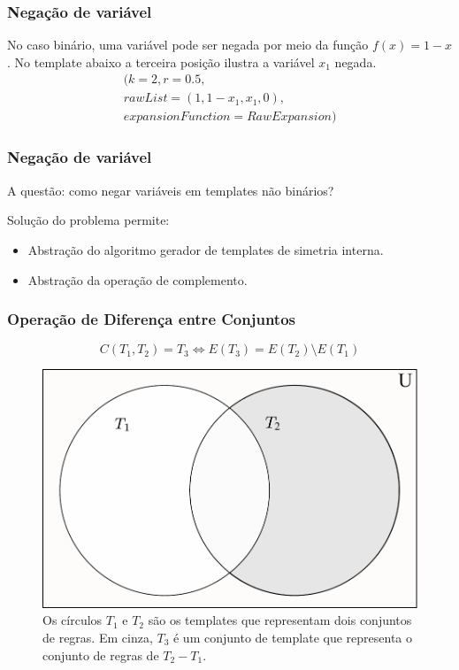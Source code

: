 \documentclass[aspectratio=43,hyperref={pdfpagelabels=false}]{beamer}
\begin{document}
 \begin{frame}
     \frametitle{Negação de variável}
     No caso binário, uma variável pode ser negada por meio da função $f(x)=1-x$. No template abaixo a terceira posição ilustra a variável $x_1$ negada. 
    \begin{equation}
    \begin{split}
    (k=2, r=0.5, \\
    rawList= (1,1-x_1,x_1,0), \\
    expansionFunction=RawExpansion)
    \end{split}
    \end{equation}
 \end{frame}

 \begin{frame}
     \frametitle{Negação de variável}
     A questão: como negar variáveis em templates não binários?

    \begin{alertblock}{Solução do problema permite:}
        \vspace{-0.4cm}
        \begin{itemize}
          \item Abstração do algoritmo gerador de templates de simetria interna.
          \item Abstração da operação de complemento.
        \end{itemize}
    \end{alertblock}
 \end{frame}

  \begin{frame}
    \frametitle{Operação de Diferença entre Conjuntos}
    \begin{equation}
    C(T_1,T_2)=T_3 \Leftrightarrow E(T_3) = E(T_2) \setminus E(T_1)
    \end{equation}

    \begin{figure}[h!]
      \centering
      \includegraphics[width=.4\textwidth]{fig_complement2.pdf}
      \caption{Os círculos $T_1$ e $T_2$ são os templates que representam dois conjuntos de regras. Em cinza, $T_3$ é um conjunto de template que representa o conjunto de regras de $T_2 - T_1$.}
      \label{fig:complement2}
    \end{figure}    
 \end{frame}
\end{document}
